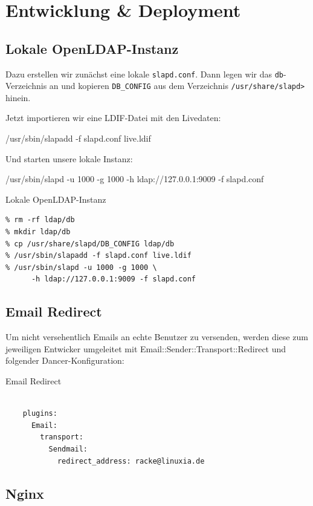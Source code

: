 \section{Entwicklung \& Deployment}

\subsection{Lokale OpenLDAP-Instanz}

Dazu erstellen wir zunächst eine lokale \verb|slapd.conf|. Dann legen
wir das \verb|db|-Verzeichnis an und kopieren \verb|DB_CONFIG| aus dem
Verzeichnis \verb|/usr/share/slapd>| hinein.

Jetzt importieren wir eine LDIF-Datei mit den Livedaten:

    /usr/sbin/slapadd -f slapd.conf live.ldif

Und starten unsere lokale Instanz:

    /usr/sbin/slapd -u 1000 -g 1000 -h ldap://127.0.0.1:9009 -f slapd.conf

\begin{frame}[fragile]{Lokale OpenLDAP-Instanz}
\begin{lstlisting}
% rm -rf ldap/db
% mkdir ldap/db
% cp /usr/share/slapd/DB_CONFIG ldap/db
% /usr/sbin/slapadd -f slapd.conf live.ldif
% /usr/sbin/slapd -u 1000 -g 1000 \
      -h ldap://127.0.0.1:9009 -f slapd.conf
\end{lstlisting}
\end{frame}

\subsection{Email Redirect}

Um nicht versehentlich Emails an echte Benutzer zu versenden,
werden diese zum jeweiligen Entwicker umgeleitet mit
Email::Sender::Transport::Redirect und folgender
Dancer-Konfiguration:

\begin{frame}[fragile]{Email Redirect}
\begin{lstlisting}

    plugins:
      Email:
        transport:
          Sendmail:
            redirect_address: racke@linuxia.de

\end{lstlisting}
\end{frame}

\subsection{Nginx}
    
